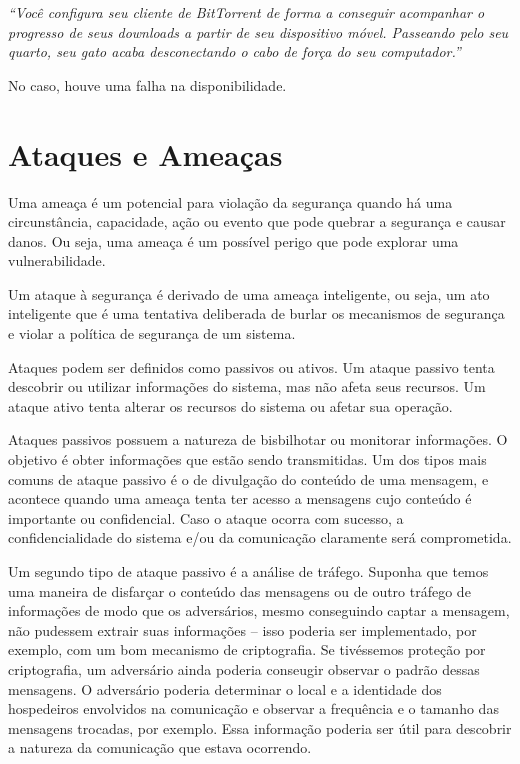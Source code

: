\documentclass[
	10pt,				%
	openright,			%
	twoside,			%
	a5paper,			%
	english,			%
	french,				%
	spanish,			%
	brazil,				%
	sumario=tradicional
]{abntex2}
\begin{document}
\textit{“Você configura seu cliente de BitTorrent de forma a conseguir acompanhar o progresso de seus downloads a partir de seu dispositivo móvel. Passeando pelo seu quarto, seu gato acaba desconectando o cabo de força do seu computador.”}

No caso, houve uma falha na disponibilidade.

\section{Ataques e Ameaças}

Uma ameaça é um potencial para violação da segurança quando há uma circunstância, capacidade, ação ou evento que pode quebrar a segurança e causar danos. Ou seja, uma ameaça é um possível perigo que pode explorar uma vulnerabilidade.

Um ataque à segurança é derivado de uma ameaça inteligente, ou seja, um ato inteligente que é uma tentativa deliberada de burlar os mecanismos de segurança e violar a política de segurança de um sistema.

Ataques podem ser definidos como passivos ou ativos. Um ataque passivo tenta descobrir ou utilizar informações do sistema, mas não afeta seus recursos. Um ataque ativo tenta alterar os recursos do sistema ou afetar sua operação.

Ataques passivos possuem a natureza de bisbilhotar ou monitorar informações. O objetivo é obter informações que estão sendo transmitidas. Um dos tipos mais comuns de ataque passivo é o de divulgação do conteúdo de uma mensagem, e acontece quando uma ameaça tenta ter acesso a mensagens cujo conteúdo é importante ou confidencial. Caso o ataque ocorra com sucesso, a confidencialidade do sistema e/ou da comunicação claramente será comprometida.

Um segundo tipo de ataque passivo é a análise de tráfego. Suponha que temos uma maneira de disfarçar o conteúdo das mensagens ou de outro tráfego de informações de modo que os adversários, mesmo conseguindo captar a mensagem, não pudessem extrair suas informações – isso poderia ser implementado, por exemplo, com um bom mecanismo de criptografia. Se tivéssemos proteção por criptografia, um adversário ainda poderia conseugir observar o padrão dessas mensagens. O adversário poderia determinar o local e a identidade dos hospedeiros envolvidos na comunicação e observar a frequência e o tamanho das mensagens trocadas, por exemplo. Essa informação poderia ser útil para descobrir a natureza da comunicação que estava ocorrendo.
\end{document}
